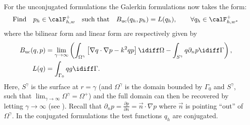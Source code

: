 For the unconjugated formulations the Galerkin formulations now takes the form: 
\begin{equation}\label{Eq2:GalerkinFormulationHelmholtz}
	\text{Find}\quad p_h\in \calF^+_{h,w}\quad \text{such that} \quad B_{\mathrm{uc}}(q_h, p_h) = L(q_h),\qquad \forall q_h\in \calF^+_{h,w^*}
\end{equation}
where the bilinear form and linear form are respectively given by
\begin{align}\label{Eq2:infElemntBilinearForm}
	B_{\mathrm{uc}}(q,p) &= \lim_{\gamma\to\infty}\left(\int_{\Omega^\gamma} \left[\nabla q\cdot \nabla p - k^2 qp\right]\idiff\Omega - \int_{S^\gamma} q\partial_n p\idiff\Gamma\right),\\
	L(q) &= \int_{\Gamma_0} qg\idiff\Gamma.\nonumber
\end{align}
Here, $S^\gamma$ is the surface at $r = \gamma$ (and $\Omega^\gamma$ is the domain bounded by $\Gamma_0$ and $S^\gamma$, such that $\lim_{\gamma\to\infty}\Omega^\gamma = \Omega^+$) and the full domain can then be recovered by letting $\gamma\to\infty$ (see ). Recall that $\partial_n p = \frac{\partial p}{\partial n}= \vec{n}\cdot\nabla p$ where $\vec{n}$ is pointing ``out'' of $\Omega^\gamma$. In the conjugated formulations the test functions $q_h$ are conjugated.

